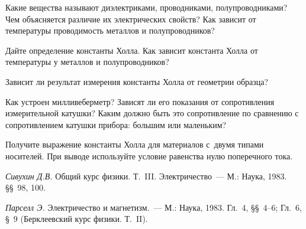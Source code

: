 \begin{lab:questions}

\item{ Какие вещества называют диэлектриками, проводниками, полупроводниками? Чем объясняется различие их электрических свойств? Как зависит от температуры проводимость металлов и полупроводников?}

\item{ Дайте определение константы Холла. Как зависит константа Холла от температуры у металлов и полупроводников?}

\item{ Зависит ли результат измерения константы Холла от геометрии образца?}

\item{ Как устроен милливеберметр? Зависят ли его показания от сопротивления измерительной катушки? Каким должно быть это сопротивление по сравнению с сопротивлением катушки прибора: большим или маленьким?}

\item{ Получите выражение константы Холла для материалов с~двумя типами носителей. При выводе используйте условие равенства нулю поперечного тока.}

\end{lab:questions}

\begin{lab:literature}

\item{ \emph{Сивухин Д.В.} Общий курс физики. Т.~III. Электричество~--- М.: Наука, 1983. \S\S~98, 100.}

\item{ \emph{Парселл Э.} Электричество и магнетизм.~--- М.: Наука, 1983. Гл.~4, \S\S~4--6; Гл.~6, \S~9 (Берклеевский курс физики. Т.~II).}

\end{lab:literature}